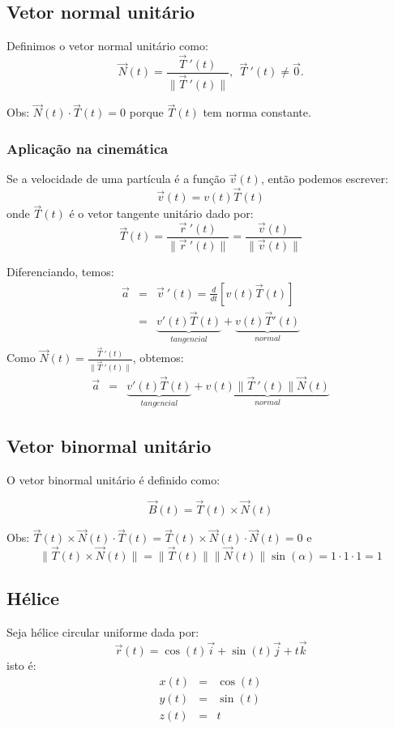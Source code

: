 \documentclass[a4paper,10pt]{article}
\begin{document}
 
 \subsection{Vetor normal unitário}
 Definimos o vetor normal unitário como:
 $$\vec{N}(t) = \frac{\vec{T}~\!'(t)}{\|\vec{T}~\!'(t)\|},~~\vec{T}~\!'(t)\neq \vec{0}.$$

  Obs: $\vec{N}(t)\cdot \vec{T}(t)=0$ porque $\vec{T}(t)$ tem norma constante. 
 

 
\subsubsection{Aplicação na cinemática}
Se a velocidade de uma partícula é a função $\vec{v}(t)$, então podemos escrever:
 $$\vec{v}(t)=v(t)\vec{T}(t)$$
onde $\vec{T}(t)$ é o vetor tangente unitário dado por:
$$\vec{T}(t) = \frac{\vec{r}~\!'(t)}{\|\vec{r}~\!'(t)\|}=\frac{\vec{v}(t)}{\|\vec{v}(t)\|} $$

Diferenciando, temos:
\begin{eqnarray*}
 \vec{a}&=&\vec{v}~\!'(t)=\frac{d}{dt}\left[v(t)\vec{T}(t)\right]\\
 &=&\underbrace{v'(t)\vec{T}(t)}_{tangencial}+\underbrace{v(t)\vec{T}'(t)}_{normal}
\end{eqnarray*}
Como $\vec{N}(t) = \frac{\vec{T}~\!'(t)}{\|\vec{T}~\!'(t)\|}$, obtemos:
\begin{eqnarray*}
 \vec{a}&=&\underbrace{v'(t)\vec{T}(t)}_{tangencial}+\underbrace{v(t)\|\vec{T}~\!'(t)\|\vec{N}(t)}_{normal}
\end{eqnarray*}
 
\subsection{Vetor binormal unitário}
O vetor binormal unitário é definido como:

 $$\vec{B}(t)=\vec{T}(t)\times\vec{N}(t)$$

 Obs: $\vec{T}(t)\times\vec{N}(t)\cdot \vec{T}(t) = \vec{T}(t)\times\vec{N}(t)\cdot \vec{N}(t)=0$ e
 $$\|\vec{T}(t)\times\vec{N}(t)\|=\|\vec{T}(t)\|\|\vec{N}(t)\|\sin(\alpha)=1\cdot 1 \cdot 1=1$$

\subsection{Hélice}
Seja  hélice circular uniforme dada por:
$$\vec{r}(t)=\cos(t)\vec{i}+\sin(t)\vec{j}+ t\vec{k}$$
isto é:
\begin{eqnarray*}
 x(t)&=&\cos(t)\\
 y(t)&=&\sin(t)\\
 z(t)&=&t
\end{eqnarray*}
\end{document}
